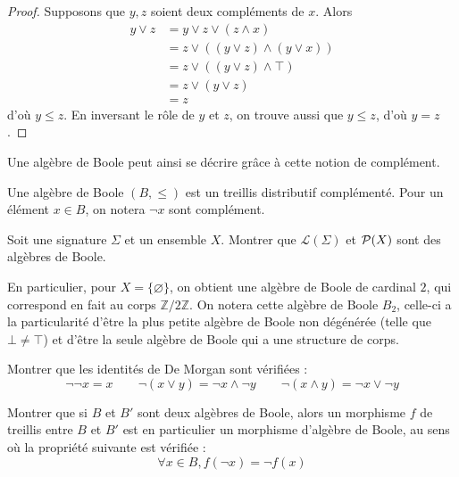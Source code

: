 \begin{proof}
  Supposons que $y,z$ soient deux compléments de $x$. Alors
  \begin{align*}
    y\lor z &= y\lor z\lor (z\land x)\\
    &= z\lor ((y\lor z)\land (y\lor x))\\
    &= z \lor ((y\lor z)\land \top)\\
    &= z \lor (y\lor z)\\
    &= z
  \end{align*}
  d'où $y\leq z$. En inversant le rôle de $y$ et $z$, on trouve aussi que
  $y\leq z$, d'où $y = z$.
\end{proof}

Une algèbre de Boole peut ainsi se décrire grâce à cette notion de complément.

\begin{definition}
  Une algèbre de Boole $(B,\leq)$ est un treillis distributif complémenté. Pour
  un élément $x\in B$, on notera $\lnot x$ sont complément.
\end{definition}

\begin{exercise}
  Soit une signature $\Sigma$ et un ensemble $X$. Montrer que
  $\mathcal L(\Sigma)$ et $\mathcal{P}(X)$ sont des algèbres de Boole.
\end{exercise}

\begin{remark}
  En particulier, pour $X = \{\varnothing\}$, on obtient une algèbre de Boole
  de cardinal $2$, qui correspond en fait au corps $\mathbb Z/2\mathbb Z$.
  On notera cette algèbre de Boole $B_2$, celle-ci a la particularité d'être
  la plus petite algèbre de Boole non dégénérée (telle que $\bot \neq \top$) et
  d'être la seule algèbre de Boole qui a une structure de corps.
\end{remark}

\begin{exercise}
  Montrer que les identités de De Morgan sont vérifiées :
  \[\lnot\lnot x = x \qquad \lnot (x \lor y) = \lnot x \land \lnot y
  \qquad \lnot (x \land y) = \lnot x \lor \lnot y\]
\end{exercise}

\begin{exercise}
  Montrer que si $B$ et $B'$ sont deux algèbres de Boole, alors un morphisme $f$
  de treillis entre $B$ et $B'$ est en particulier un morphisme d'algèbre de
  Boole, au sens où la propriété suivante est vérifiée :
  \[\forall x \in B, f(\lnot x) = \lnot f(x)\]
\end{exercise}

